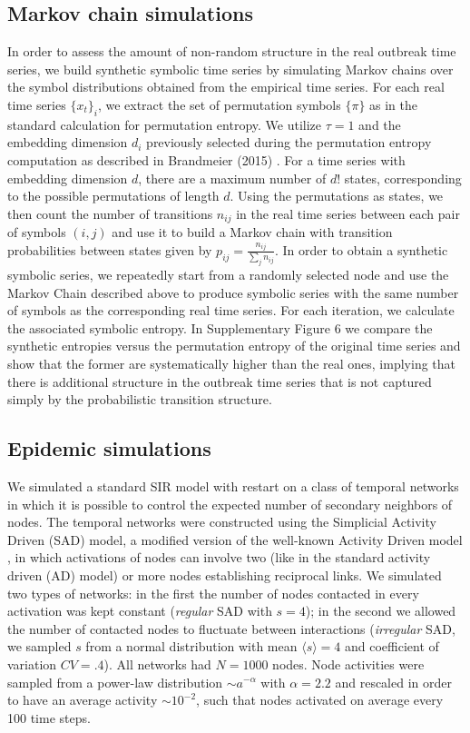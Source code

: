 \documentclass[fleqn,12pt]{wlscirep}
\begin{document}
\subsection*{Markov chain simulations}
In order to assess the amount of non-random structure in the real outbreak time series, we build synthetic symbolic time series by simulating Markov chains over the symbol distributions obtained from the empirical time series.  
For each real time series $\{x_t \}_i$, we extract the set of permutation symbols $\{\pi\}$ as in the standard calculation for permutation entropy. 
We utilize $\tau=1$ and the embedding dimension $d_i$ previously selected during the permutation entropy computation as described in Brandmeier (2015) \cite{brandmaier2015pdc}. For a time series with embedding dimension $d$, there are a maximum number of $d!$ states, corresponding to the possible permutations of length $d$. Using the permutations as states, we then count the number of transitions $n_{ij}$ in the real time series between each pair of symbols $(i,j)$ and use it to build a Markov chain with transition probabilities between states given by  $p_{ij} = \frac{n_{ij}}{\sum_{j} n_{ij}}$. 
In order to obtain a synthetic symbolic series, we repeatedly start from a randomly selected node and use the Markov Chain described above to produce symbolic series with the same number of symbols as the corresponding real time series. For each iteration, we calculate the associated symbolic entropy. 
In Supplementary Figure 6 we compare the synthetic entropies versus the permutation entropy of the original time series and show that the former are systematically higher than the real ones, implying that there is additional structure in the outbreak time series that is not captured simply by the probabilistic transition structure.

\subsection*{Epidemic simulations}
We simulated a standard SIR model with restart on a class of temporal networks in which it is possible to control the expected number of secondary neighbors of nodes. The temporal networks were constructed using the Simplicial Activity Driven (SAD) model, a modified version of the well-known Activity Driven model \cite{perra2012activity}, in which activations of nodes can involve two (like in the standard activity driven (AD) model) or more nodes establishing reciprocal links. 
We simulated two types of networks: in the first the number of nodes contacted in every activation was kept constant (\textit{regular} SAD with $s=4$); in the second we allowed the number of contacted nodes to fluctuate between interactions (\textit{irregular} SAD, we sampled $s$ from a normal distribution with mean $\langle s \rangle = 4$ and coefficient of variation $CV=.4$). All networks had $N=1000$ nodes. 
Node activities were sampled from a power-law distribution $\sim a^{-\alpha}$ with $\alpha = 2.2$ and rescaled in order to have an average activity $\sim 10^{-2}$, such that nodes activated on average every 100 time steps.
\end{document}
